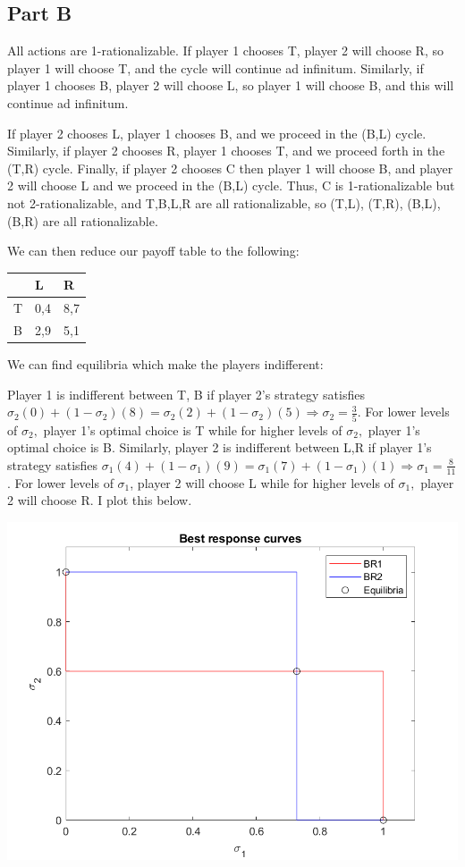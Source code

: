 \documentclass[11pt]{article} %
\begin{document}
\subsection{Part B}
All actions are 1-rationalizable. If player 1 chooses T, player 2 will choose R, so player 1 will choose T, and the cycle will continue ad infinitum. Similarly, if player 1 chooses B, player 2 will choose L, so player 1 will choose B, and this will continue ad infinitum.

If player 2 chooses L, player 1 chooses B, and we proceed in the (B,L) cycle. Similarly, if player 2 chooses R, player 1 chooses T, and we proceed forth in the (T,R) cycle. Finally, if player 2 chooses C then player 1 will choose B, and player 2 will choose L and we proceed in the (B,L) cycle. Thus, C is 1-rationalizable but not 2-rationalizable, and T,B,L,R are all rationalizable, so (T,L), (T,R), (B,L), (B,R) are all rationalizable.

We can then reduce our payoff table to the following:

\begin{center}
\begin{tabular}{l | l l }
 &L & R\\
\hline
T &0,4 & 8,7 \\
B &2,9 & 5,1
\end{tabular}
\end{center}

We can find equilibria which make the players indifferent:

Player 1 is indifferent between T, B if player 2's strategy satisfies \\$\sigma_2(0)+(1-\sigma_2)(8) = \sigma_2(2) + (1-\sigma_2)(5) \Rightarrow \sigma_2 =\frac{3}{5}. $ For lower levels of $\sigma_2,$ player 1's optimal choice is T while for higher levels of $\sigma_2,$ player 1's optimal choice is B. Similarly, player 2 is indifferent between L,R if player 1's strategy satisfies $\sigma_1 (4) + (1-\sigma_1) (9) = \sigma_1 (7) + (1-\sigma_1)(1)  \Rightarrow \sigma_1 = \frac{8}{11}$. For lower levels of $\sigma_1$, player 2 will choose L while for higher levels of $\sigma_1,$ player 2 will choose R. I plot this below.

\includegraphics{fig1}
\end{document}
